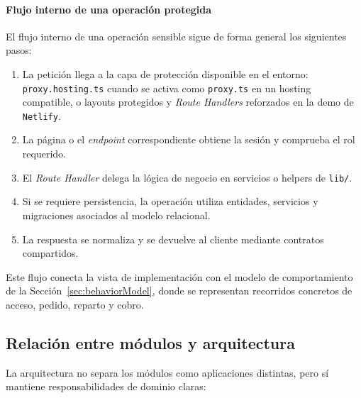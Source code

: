 \paragraph{Flujo interno de una operación protegida}

El flujo interno de una operación sensible sigue de forma general los siguientes pasos:

\begin{enumerate}
    \item La petición llega a la capa de protección disponible en el entorno: \texttt{proxy.hosting.ts} cuando se activa como \texttt{proxy.ts} en un hosting compatible, o layouts protegidos y \textit{Route Handlers} reforzados en la demo de \texttt{Netlify}.
    \item La página o el \textit{endpoint} correspondiente obtiene la sesión y comprueba el rol requerido.
    \item El \textit{Route Handler} delega la lógica de negocio en servicios o helpers de \texttt{lib/}.
    \item Si se requiere persistencia, la operación utiliza entidades, servicios y migraciones asociados al modelo relacional.
    \item La respuesta se normaliza y se devuelve al cliente mediante contratos compartidos.
\end{enumerate}

Este flujo conecta la vista de implementación con el modelo de comportamiento de la Sección~\ref{sec:behaviorModel}, donde se representan recorridos concretos de acceso, pedido, reparto y cobro.

\subsection{Relación entre módulos y arquitectura}

La arquitectura no separa los módulos como aplicaciones distintas, pero sí mantiene responsabilidades de dominio claras:

